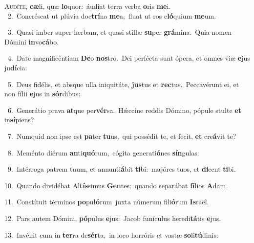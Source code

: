 \lettrine{\initial\textcolor{\initialcolor}{A}}{udíte,} \textbf{cæ}\-li, quæ \textbf{lo}\-quor:~\star áudiat terra verba \textbf{o}\-ris \textbf{me}\-i.\\
{\numbfont\textcolor{\numbcolor}{~2.}}~Concréscat ut plúvia doc\-\textbf{trí}\-na \textbf{me}\-a,~\star fluat ut ros e\-\textbf{ló}\-quium \textbf{me}\-um.\par
{\numbfont\textcolor{\numbcolor}{~3.}}~Quasi imber super herbam, et quasi stillæ \textbf{su}\-per \textbf{grá}\-mina.~\star Quia nomen Dómini \textbf{in}\-vo\-\textbf{cá}\-bo.\par
{\numbfont\textcolor{\numbcolor}{~4.}}~Date magnificéntiam \textbf{De}\-o \textbf{nos}\-tro.~\star Dei perfécta sunt ópera, et omnes viæ \textbf{e}\-jus ju\-\textbf{dí}\-cia:\par
{\numbfont\textcolor{\numbcolor}{~5.}}~Deus fidélis, et absque ulla iniquitáte, \textbf{jus}\-tus et \textbf{rec}\-tus.~\star Peccavérunt ei, et non fílii \textbf{e}\-jus in \textbf{sór}\-dibus:\par
{\numbfont\textcolor{\numbcolor}{~6.}}~Generátio prava \textbf{at}\-que per\-\textbf{vér}\-sa.~\star Hǽccine reddis Dómino, pópule stulte \textbf{et} in\-\textbf{sí}\-piens?\par
{\numbfont\textcolor{\numbcolor}{~7.}}~Numquid non ipse est \textbf{pa}\-ter \textbf{tu}\-us,~\star qui possédit te, et fecit, \textbf{et} cre\-\textbf{á}\-vit te?\par
{\numbfont\textcolor{\numbcolor}{~8.}}~Meménto diérum \textbf{an}\-ti\-\textbf{quó}\-rum,~\star cógita generati\-\textbf{ó}\-nes \textbf{sín}\-gulas:\par
{\numbfont\textcolor{\numbcolor}{~9.}}~Intérroga patrem tuum, et annunti\-\textbf{á}\-bit \textbf{ti}\-bi:~\star majóres tuos, et \textbf{di}\-cent \textbf{ti}\-bi.\par
{\numbfont\textcolor{\numbcolor}{10.}}~Quando dividébat Al\-\textbf{tís}\-simus \textbf{Gen}\-tes:~\star quando separábat \textbf{fí}\-lios \textbf{A}\-dam.\par
{\numbfont\textcolor{\numbcolor}{11.}}~Constítuit términos \textbf{po}\-pu\-\textbf{ló}\-rum~\star juxta númerum fili\-\textbf{ó}\-rum \textbf{Is}\-raël.\par
{\numbfont\textcolor{\numbcolor}{12.}}~Pars autem Dómini, \textbf{pó}\-pulus \textbf{e}\-jus:~\star Jacob funículus heredi\-\textbf{tá}\-tis \textbf{e}\-jus.\par
{\numbfont\textcolor{\numbcolor}{13.}}~Invénit eum in \textbf{ter}\-ra de\-\textbf{sér}\-ta,~\star in loco horróris et vastæ \textbf{so}\-li\-\textbf{tú}\-dinis:\par
